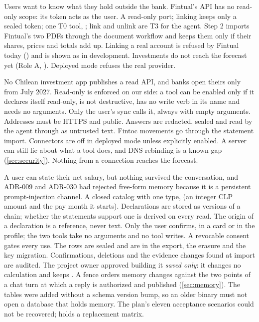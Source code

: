  Users want to know what they hold outside the bank. Fintual's API has no read-only scope: its token
acts as the user.
 A read-only  port; linking keeps only a sealed token; one T0 tool,
; link and unlink are T3 for the agent. Step 2 imports Fintual's two PDFs through the document
workflow and keeps them only if their shares, prices and totals add up. Linking a real account is refused by Fintual
today () and is shown as in development.
 Investments do not reach the forecast yet (Role A, ). Deployed mode refuses the
real provider.

 No Chilean investment app publishes a read API, and banks open theirs only from July 2027.
 Read-only is enforced on our side: a tool can be enabled only if it declares itself read-only, is
not destructive, has no write verb in its name and needs no arguments. Only the user's sync calls it, always with
empty arguments. Addresses must be HTTPS and public. Answers are redacted, sealed and read by the agent through
 as untrusted text. Fintoc movements go through the statement import. Connectors are off in
deployed mode unless explicitly enabled.
 A server can still lie about what a tool does, and DNS rebinding is a known gap
(\cref{sec:security}). Nothing from a connection reaches the forecast.

 A user can state their net salary, but nothing survived the conversation, and ADR-009 and ADR-030 had
rejected free-form memory because it is a persistent prompt-injection channel.
 A closed catalog  with one type,  (an integer CLP amount and the pay
month it starts). Declarations are stored as versions of a chain; whether the statements support one is derived on every
read. The origin of a declaration is a reference, never text. Only the user confirms, in a card or in the profile; the
two tools take no arguments and no tool writes. A revocable consent gates every use. The rows are sealed and are in the
export, the erasure and the key migration. Confirmations, deletions and the evidence changes found at import are audited.
 The project owner approved building it \emph{saved only}: it changes no calculation and keeps
. A fence orders memory changes against the two points of a chat turn at which a reply is authorized and
published (\cref{sec:memory}). The tables were added without a schema version bump, so an older binary must not open a
database that holds memory. The plan's eleven acceptance scenarios could not be recovered; 
holds a replacement matrix.

